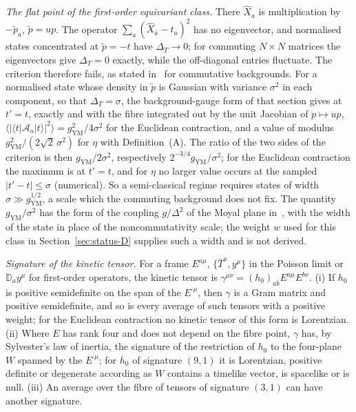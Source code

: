 \emph{The flat point of the first-order equivariant class.} There \(\hat X_a\) is multiplication by \(-\tilde p_a\), \(\tilde p=up\). The operator \(\sum_a(\hat X_a-t_a)^2\) has no eigenvector, and normalised states concentrated at \(\tilde p=-t\) have \(\Delta_T\to0\); for commuting \(N\times N\) matrices the eigenvectors give \(\Delta_T=0\) exactly, while the off-diagonal entries fluctuate. The criterion therefore fails, as stated in~\cite{Steinacker2026Weak} for commutative backgrounds. For a normalised state whose density in \(\tilde p\) is Gaussian with variance \(\sigma^2\) in each component, so that \(\Delta_T=\sigma\), the background-gauge form of that section gives at \(t'=t\), exactly and with the fibre integrated out by the unit Jacobian of \(p\mapsto up\), \(\langle|\langle t|\mathcal A_a|t\rangle|^2\rangle=g_{\mathrm{YM}}^2/4\sigma^2\) for the Euclidean contraction, and a value of modulus \(g_{\mathrm{YM}}^2/(2\sqrt2\,\sigma^2)\) for \(\eta\) with Definition~(A). The ratio of the two sides of the criterion is then \(g_{\mathrm{YM}}/2\sigma^2\), respectively \(2^{-3/4}g_{\mathrm{YM}}/\sigma^2\); for the Euclidean contraction the maximum is at \(t'=t\), and for \(\eta\) no larger value occurs at the sampled \(|t'-t|\le\sigma\) (numerical). So a semi-classical regime requires states of width \(\sigma\gg g_{\mathrm{YM}}^{1/2}\), a scale which the commuting background does not fix. The quantity \(g_{\mathrm{YM}}/\sigma^2\) has the form of the coupling \(g/\Delta^2\) of the Moyal plane in~\cite{Steinacker2026Weak}, with the width of the state in place of the noncommutativity scale; the weight \(w\) used for this class in Section~\ref{sec:status-D} supplies such a width and is not derived.

\emph{Signature of the kinetic tensor.} For a frame \(E^{a\mu}\), \(\{\bar T^a,y^\mu\}\) in the Poisson limit or \(\mathbb D_ay^\mu\) for first-order operators, the kinetic tensor is \(\gamma^{\mu\nu}=(h_0)_{ab}E^{a\mu}E^{b\nu}\). (i) If \(h_0\) is positive semidefinite on the span of the \(E^{\cdot\mu}\), then \(\gamma\) is a Gram matrix and positive semidefinite, and so is every average of such tensors with a positive weight; for the Euclidean contraction no kinetic tensor of this form is Lorentzian. (ii) Where \(E\) has rank four and does not depend on the fibre point, \(\gamma\) has, by Sylvester's law of inertia, the signature of the restriction of \(h_0\) to the four-plane \(W\) spanned by the \(E^{\cdot\mu}\); for \(h_0\) of signature \((9,1)\) it is Lorentzian, positive definite or degenerate according as \(W\) contains a timelike vector, is spacelike or is null. (iii) An average over the fibre of tensors of signature \((3,1)\) can have another signature.

